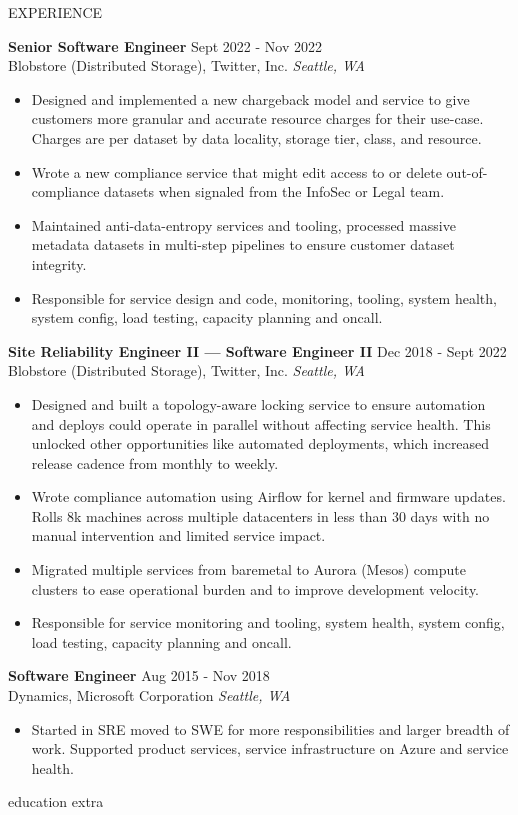 \documentclass{resume}
\begin{document}
\begin{rSection}{EXPERIENCE}

\textbf{Senior Software Engineer} \hfill Sept 2022 - Nov 2022\\
Blobstore (Distributed Storage), Twitter, Inc. \hfill \textit{Seattle, WA}
 \begin{itemize}
    \itemsep -3pt {} 
     \item Designed and implemented a new chargeback model and service to give customers more granular and accurate resource charges for their use-case. Charges are per dataset by data locality, storage tier, class, and resource.
     \item Wrote a new compliance service that might edit access to or delete out-of-compliance datasets when signaled from the InfoSec or Legal team.
     \item Maintained anti-data-entropy services and tooling, processed massive metadata datasets in multi-step pipelines to ensure customer dataset integrity.
     \item Responsible for service design and code, monitoring, tooling, system health, system config, load testing, capacity planning and oncall.
 \end{itemize}

 \textbf{ Site Reliability Engineer II --- Software Engineer II} \hfill Dec 2018 - Sept 2022 \\
Blobstore (Distributed Storage), Twitter, Inc. \hfill \textit{Seattle, WA}
 \begin{itemize}
    \itemsep -3pt {} 
     \item Designed and built a topology-aware locking service to ensure automation and deploys could operate in parallel without affecting service health. This unlocked other opportunities like automated deployments, which increased release cadence from monthly to weekly.
     \item Wrote compliance automation using Airflow for kernel and firmware updates. Rolls 8k machines across multiple datacenters in less than 30 days with no manual intervention and limited service impact. 
     \item Migrated multiple services from baremetal to Aurora (Mesos) compute clusters to ease operational burden and to improve development velocity.
     \item Responsible for service monitoring and tooling, system health, system config, load testing, capacity planning and oncall.
 \end{itemize}

\textbf{Software Engineer} \hfill Aug 2015 - Nov 2018\\
Dynamics, Microsoft Corporation \hfill \textit{Seattle, WA}
 \begin{itemize}
    \itemsep -3pt {} 
     \item Started in SRE moved to SWE for more responsibilities and larger breadth of work. Supported product services, service infrastructure on Azure and service health. 
 \end{itemize}
\end{rSection} 

{education}
{extra}
\end{document}

